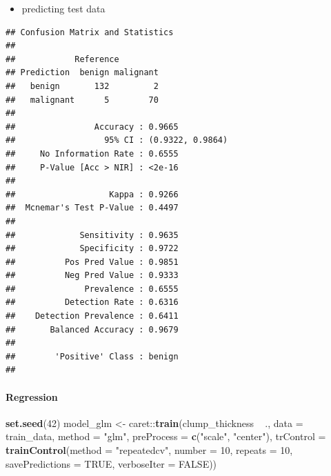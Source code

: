 \documentclass[]{article}
\newenvironment{Shaded}{\begin{snugshade}}{\end{snugshade}}
\newcommand{\KeywordTok}[1]{\textcolor[rgb]{0.13,0.29,0.53}{\textbf{{#1}}}}
\newcommand{\DataTypeTok}[1]{\textcolor[rgb]{0.13,0.29,0.53}{{#1}}}
\newcommand{\DecValTok}[1]{\textcolor[rgb]{0.00,0.00,0.81}{{#1}}}
\newcommand{\StringTok}[1]{\textcolor[rgb]{0.31,0.60,0.02}{{#1}}}
\newcommand{\OtherTok}[1]{\textcolor[rgb]{0.56,0.35,0.01}{{#1}}}
\newcommand{\NormalTok}[1]{{#1}}
\providecommand{\tightlist}{%
  \setlength{\itemsep}{0pt}\setlength{\parskip}{0pt}}
\let\oldparagraph\paragraph
\renewcommand{\paragraph}[1]{\oldparagraph{#1}\mbox{}}
\begin{document}
\begin{itemize}
\tightlist
\item
  predicting test data
\end{itemize}

\begin{Shaded}
\end{Shaded}

\begin{verbatim}
## Confusion Matrix and Statistics
## 
##            Reference
## Prediction  benign malignant
##   benign       132         2
##   malignant      5        70
##                                           
##                Accuracy : 0.9665          
##                  95% CI : (0.9322, 0.9864)
##     No Information Rate : 0.6555          
##     P-Value [Acc > NIR] : <2e-16          
##                                           
##                   Kappa : 0.9266          
##  Mcnemar's Test P-Value : 0.4497          
##                                           
##             Sensitivity : 0.9635          
##             Specificity : 0.9722          
##          Pos Pred Value : 0.9851          
##          Neg Pred Value : 0.9333          
##              Prevalence : 0.6555          
##          Detection Rate : 0.6316          
##    Detection Prevalence : 0.6411          
##       Balanced Accuracy : 0.9679          
##                                           
##        'Positive' Class : benign          
## 
\end{verbatim}

\paragraph{Regression}\label{regression}

\begin{Shaded}
\begin{Highlighting}[]
\KeywordTok{set.seed}\NormalTok{(}\DecValTok{42}\NormalTok{)}
\NormalTok{model_glm <-}\StringTok{ }\NormalTok{caret::}\KeywordTok{train}\NormalTok{(clump_thickness ~}\StringTok{ }\NormalTok{.,}
                          \DataTypeTok{data =} \NormalTok{train_data,}
                          \DataTypeTok{method =} \StringTok{"glm"}\NormalTok{,}
                          \DataTypeTok{preProcess =} \KeywordTok{c}\NormalTok{(}\StringTok{"scale"}\NormalTok{, }\StringTok{"center"}\NormalTok{),}
                          \DataTypeTok{trControl =} \KeywordTok{trainControl}\NormalTok{(}\DataTypeTok{method =} \StringTok{"repeatedcv"}\NormalTok{, }
                                                  \DataTypeTok{number =} \DecValTok{10}\NormalTok{, }
                                                  \DataTypeTok{repeats =} \DecValTok{10}\NormalTok{, }
                                                  \DataTypeTok{savePredictions =} \OtherTok{TRUE}\NormalTok{, }
                                                  \DataTypeTok{verboseIter =} \OtherTok{FALSE}\NormalTok{))}
\end{Highlighting}
\end{Shaded}
\end{document}
